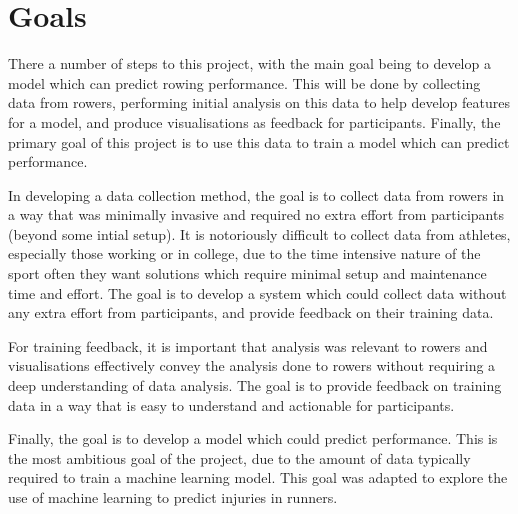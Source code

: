 
\section{Goals}
There a number of steps to this project, with the main goal being to develop a model which can predict rowing performance. This will be done by collecting data from rowers, performing initial analysis on this data to help develop features for a model, and produce visualisations as feedback for participants. Finally, the primary goal of this project is to use this data to train a model which can predict performance. 

In developing a data collection method, the goal is to collect data from rowers in a way that was minimally invasive and required no extra effort from participants (beyond some intial setup). It is notoriously difficult to collect data from athletes, especially those working or in college, due to the time intensive nature of the sport often they want solutions which require minimal setup and maintenance time and effort. The goal is to develop a system which could collect data without any extra effort from participants, and provide feedback on their training data.

For training feedback, it is important that analysis was relevant to rowers and visualisations effectively convey the analysis done to rowers without requiring a deep understanding of data analysis. The goal is to provide feedback on training data in a way that is easy to understand and actionable for participants.

Finally, the goal is to develop a model which could predict performance. This is the most ambitious goal of the project, due to the amount of data typically required to train a machine learning model. This goal was adapted to explore the use of machine learning to predict injuries in runners.

